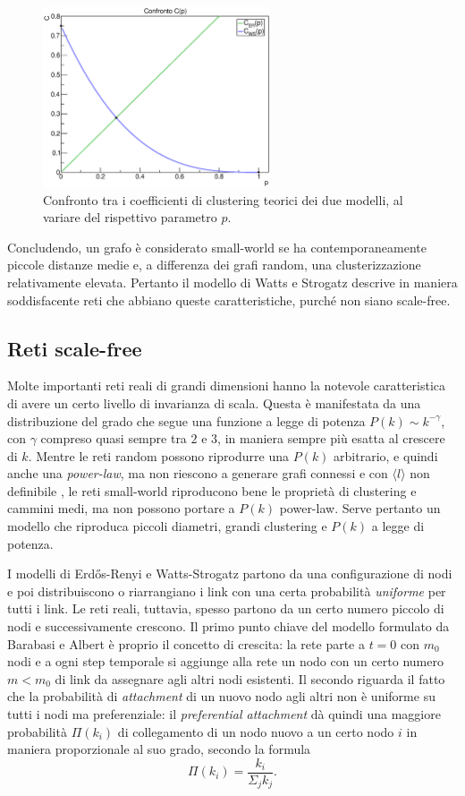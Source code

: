 \begin{figure}[t!]
	\centering
	\includegraphics[width=0.6\textwidth]{./Immagini/Par1/confrontoC}
	\caption[Confronto clustering.]{Confronto tra i coefficienti di clustering teorici dei due modelli, al variare del rispettivo parametro $p$.}
	\label{fig:ring}
\end{figure}

Concludendo, un grafo è considerato small-world se ha contemporaneamente piccole distanze medie e, a differenza dei grafi random,  una clusterizzazione relativamente elevata. Pertanto il modello di Watts e Strogatz descrive in maniera soddisfacente reti che abbiano queste caratteristiche, purché non siano scale-free.

\subsection{Reti scale-free} 
Molte importanti reti reali di grandi dimensioni hanno la notevole caratteristica di avere un certo livello di invarianza di scala. Questa è manifestata da una distribuzione del grado che segue una funzione a legge di potenza $P(k)\sim k^{-\gamma}$, con $\gamma$ compreso quasi sempre tra $2$ e $3$, in maniera sempre più esatta al crescere di $k$. Mentre le reti random possono riprodurre una $P(k)$ arbitrario, e quindi anche una \emph{power-law}, ma non riescono a generare grafi connessi e con $\langle l \rangle$ non definibile \parencite{Barbalbert2002}, le reti small-world riproducono bene le proprietà di clustering e cammini medi, ma non possono portare a $P(k)$ power-law. Serve pertanto un modello che riproduca piccoli diametri, grandi clustering e $P(k)$ a legge di potenza.

I modelli di Erdős-Renyi e Watts-Strogatz partono da una configurazione di nodi e poi distribuiscono o riarrangiano i link con una certa probabilità \emph{uniforme} per tutti i link. Le reti reali, tuttavia, spesso partono da un certo numero piccolo di nodi e successivamente crescono. Il primo punto chiave del modello formulato da Barabasi e Albert è proprio il concetto di crescita: la rete parte a $t=0$ con $m_0$ nodi e a ogni step temporale si aggiunge alla rete un nodo con un certo numero $m < m_0$ di link da assegnare agli altri nodi esistenti. Il secondo riguarda il fatto che la probabilità di \emph{attachment} di un nuovo nodo agli altri non è uniforme su tutti i nodi ma preferenziale: il \emph{preferential attachment} dà quindi una maggiore probabilità $\Pi (k_i)$ di collegamento di un nodo nuovo a un certo nodo $i$ in maniera proporzionale al suo grado, secondo la formula
\[\Pi (k_i) = \frac{k_i}{\Sigma_j k_j}.\]

